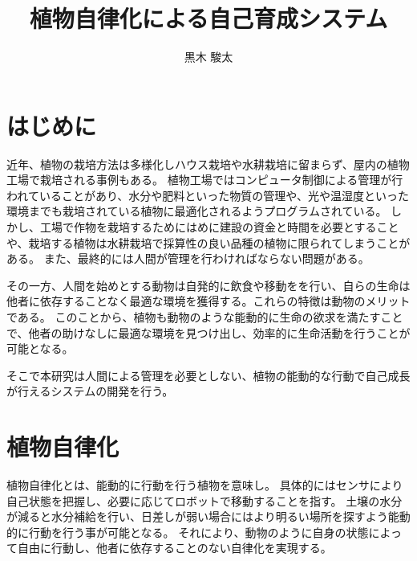 \documentclass[10pt]{jsarticle}
\begin{document}
\pagestyle{empty}

\setlength{\baselineskip}{13truept}

\title{植物自律化による自己育成システム}
\author{黒木 駿太}

\maketitle
\thispagestyle{empty}

\section{はじめに}
近年、植物の栽培方法は多様化しハウス栽培や水耕栽培に留まらず、屋内の植物工場で栽培される事例もある。
植物工場ではコンピュータ制御による管理が行われていることがあり、水分や肥料といった物質の管理や、光や温湿度といった環境までも栽培されている植物に最適化されるようプログラムされている。
しかし、工場で作物を栽培するためにはめに建設の資金と時間を必要とすることや、栽培する植物は水耕栽培で採算性の良い品種の植物に限られてしまうことがある。
また、最終的には人間が管理を行わければならない問題がある。

その一方、人間を始めとする動物は自発的に飲食や移動をを行い、自らの生命は他者に依存することなく最適な環境を獲得する。これらの特徴は動物のメリットである。
このことから、植物も動物のような能動的に生命の欲求を満たすことで、他者の助けなしに最適な環境を見つけ出し、効率的に生命活動を行うことが可能となる。

そこで本研究は人間による管理を必要としない、植物の能動的な行動で自己成長が行えるシステムの開発を行う。

\section{植物自律化}
植物自律化とは、能動的に行動を行う植物を意味し。
具体的にはセンサにより自己状態を把握し、必要に応じてロボットで移動することを指す。
土壌の水分が減ると水分補給を行い、日差しが弱い場合にはより明るい場所を探すよう能動的に行動を行う事が可能となる。
それにより、動物のように自身の状態によって自由に行動し、他者に依存することのない自律化を実現する。
\end{document}
